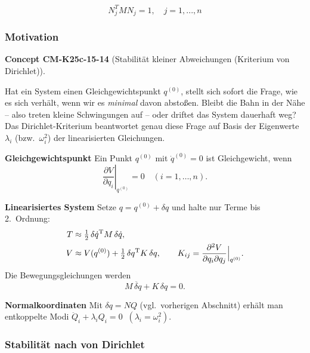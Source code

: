 \documentclass[10pt, letterpaper]{article}
\newcommand{\CustomHeading}[3]{%
  \par\medskip\noindent%
  \textbf{#1 #2} \textnormal{(#3)}.\enskip%
}
\newenvironment{CONC}[2]{\begin{unitbox}\CustomHeading{Concept}{#1}{#2}}{\end{unitbox}}
\begin{document}
\[N_j^T M N_j = 1, \quad j=1,...,n \tag{7}\]






\subsubsection*{Motivation}


\begin{CONC}{CM-K25c-15-14}{Stabilität kleiner Abweichungen (Kriterium von Dirichlet)}
Hat ein System einen Gleichgewichtspunkt $q^{(0)}$, stellt sich sofort
die Frage, wie es sich verhält, wenn wir es \emph{minimal} davon
abstoßen.  Bleibt die Bahn in der Nähe – also treten kleine Schwingungen
auf – oder driftet das System dauerhaft weg?
Das Dirichlet-Kriterium beantwortet genau diese Frage auf Basis der
Eigenwerte $\lambda_i$ (bzw.\ $\omega_i^2$) der linearisierten
Gleichungen.

\textbf{Gleichgewichtspunkt}
Ein Punkt $q^{(0)}$ mit $\dot q^{(0)}=0$ ist Gleichgewicht, wenn  
\[
  \left.\frac{\partial V}{\partial q_i}\right|_{q^{(0)}} = 0
  \quad (i=1,\dots,n).
\]

\textbf{Linearisiertes System}
Setze $q=q^{(0)}+\delta q$ und halte nur Terme bis 2.\ Ordnung:
\begin{align*}
  T &\approx \tfrac12 \,\delta\dot q^{\mathrm T}M\,\delta\dot q, \\
  V &\approx V(q^{(0)})
        + \tfrac12 \,\delta q^{\mathrm T}K\,\delta q,
        \qquad
        K_{ij}= \Bigl.\frac{\partial^2V}{\partial q_i\partial q_j}
                 \Bigr|_{q^{(0)}} .
\end{align*}
Die Bewegungsgleichungen werden
\[
  M\,\ddot{\delta q}+K\,\delta q = 0.
\]

\textbf{Normalkoordinaten}
Mit $\delta q = N Q$ (vgl.\ vorherigen Abschnitt) erhält man
entkoppelte Modi
\(
  \ddot Q_i + \lambda_i Q_i = 0
  \;\;(\lambda_i = \omega_i^2).
\)
\end{CONC}

\subsubsection*{Stabilität nach von Dirichlet}
\end{document}
